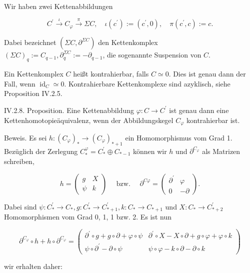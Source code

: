 \documentclass[10pt, letterpaper]{article}
\begin{document}
Wir haben zwei Kettenabbildungen

$$
C^{\prime} \xrightarrow{\iota} C_{\varphi} \xrightarrow{\pi} \Sigma C, \quad \iota\left(c^{\prime}\right):=\left(c^{\prime}, 0\right), \quad \pi\left(c^{\prime}, c\right):=c .
$$


Dabei bezeichnet $\left(\Sigma C, \partial^{\Sigma C}\right)$ den Kettenkomplex $(\Sigma C)_q:=C_{q-1}, \partial_q^{\Sigma C}:=-\partial_{q-1}$, die sogenannte Suspension von $C$.

Ein Kettenkomplex $C$ heißt kontrahierbar, falls $C \simeq 0$. Dies ist genau dann der Fall, wenn $\operatorname{id}_C \simeq 0$. Kontrahierbare Kettenkomplexe sind azyklisch, siehe Proposition IV.2.5.



IV.2.8. Proposition. Eine Kettenabbildung $\varphi: C \rightarrow C^{\prime}$ ist genau dann eine Kettenhomotopieäquivalenz, wenn der Abbildungskegel $C_{\varphi}$ kontrahierbar ist.


Beweis. Es sei $h:\left(C_{\varphi}\right)_* \rightarrow\left(C_{\varphi}\right)_{*+1}$ ein Homomorphismus vom Grad 1. Bezüglich der Zerlegung $C_*^{\varphi}=C_*^{\prime} \oplus C_{*-1}$ können wir $h$ und $\partial^{C_{\varphi}}$ als Matrizen schreiben,

$$
h=\left(\begin{array}{cc}
g & X \\
\psi & k
\end{array}\right) \quad \text { bzw. } \quad \partial^{C \varphi}=\left(\begin{array}{cc}
\partial^{\prime} & \varphi \\
0 & -\partial
\end{array}\right) .
$$

Dabei sind $\psi: C_*^{\prime} \rightarrow C_*, g: C_*^{\prime} \rightarrow C_{*+1}^{\prime}, k: C_* \rightarrow C_{*+1}$ und $X: C_* \rightarrow C_{*+2}^{\prime}$ Homomorphismen vom Grad 0, 1, 1 bzw. 2. Es ist nun

$$
\partial^{C_{\varphi}} \circ h+h \circ \partial^{C_{\varphi}}=\left(\begin{array}{cc}
\partial^{\prime} \circ g+g \circ \partial+\varphi \circ \psi & \partial^{\prime} \circ X-X \circ \partial+g \circ \varphi+\varphi \circ k \\
\psi \circ \partial^{\prime}-\partial \circ \psi & \psi \circ \varphi-k \circ \partial-\partial \circ k
\end{array}\right)
$$

wir erhalten daher:
\end{document}
